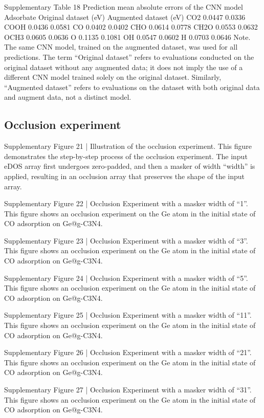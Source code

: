 Supplementary Table 18
Prediction mean absolute errors of the CNN model
Adsorbate	Original dataset (eV)	Augmented dataset (eV)
CO2	0.0447	0.0336
COOH	0.0436	0.0581
CO	0.0402	0.0402
CHO	0.0614	0.0778
CH2O	0.0553	0.0632
OCH3	0.0605	0.0636
O	0.1135	0.1081
OH	0.0547	0.0602
H	0.0703	0.0646
Note. The same CNN model, trained on the augmented dataset, was used for all predictions. The term “Original dataset” refers to evaluations conducted on the original dataset without any augmented data; it does not imply the use of a different CNN model trained solely on the original dataset. Similarly, “Augmented dataset” refers to evaluations on the dataset with both original data and augment data, not a distinct model.


\subsection{Occlusion experiment}

Supplementary Figure 21 | Illustration of the occlusion experiment. This figure demonstrates the step-by-step process of the occlusion experiment. The input eDOS array first undergoes zero-padded, and then a masker of width “width” is applied, resulting in an occlusion array that preserves the shape of the input array.


Supplementary Figure 22 | Occlusion Experiment with a masker width of “1”. This figure shows an occlusion experiment on the Ge atom in the initial state of CO adsorption on Ge@g-C3N4.


Supplementary Figure 23 | Occlusion Experiment with a masker width of “3”. This figure shows an occlusion experiment on the Ge atom in the initial state of CO adsorption on Ge@g-C3N4.


Supplementary Figure 24 | Occlusion Experiment with a masker width of “5”. This figure shows an occlusion experiment on the Ge atom in the initial state of CO adsorption on Ge@g-C3N4.

Supplementary Figure 25 | Occlusion Experiment with a masker width of “11”. This figure shows an occlusion experiment on the Ge atom in the initial state of CO adsorption on Ge@g-C3N4.


Supplementary Figure 26 | Occlusion Experiment with a masker width of “21”. This figure shows an occlusion experiment on the Ge atom in the initial state of CO adsorption on Ge@g-C3N4.

Supplementary Figure 27 | Occlusion Experiment with a masker width of “31”. This figure shows an occlusion experiment on the Ge atom in the initial state of CO adsorption on Ge@g-C3N4.



